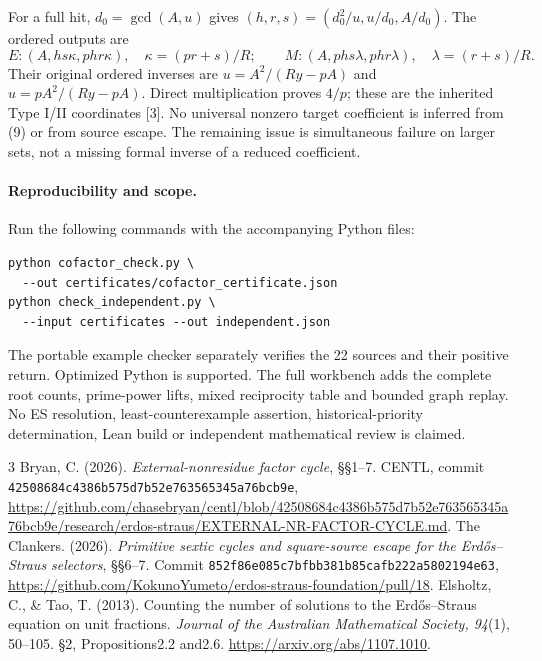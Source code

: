 \documentclass[11pt,reqno]{amsart}
\begin{document}
For a full hit, $d_0=\gcd(A,u)$ gives $(h,r,s)=(d_0^2/u,u/d_0,A/d_0)$.
The ordered outputs are
\[
 E:(A,hs\kappa,phr\kappa),\quad\kappa=(pr+s)/R;
 \qquad M:(A,phs\lambda,phr\lambda),\quad\lambda=(r+s)/R.
\]
Their original ordered inverses are $u=A^2/(Ry-pA)$ and $u=pA^2/(Ry-pA)$.
Direct multiplication proves $4/p$; these are the inherited Type I/II coordinates [3].
No universal nonzero target coefficient is inferred from (9) or from source escape.
The remaining issue is simultaneous failure on larger sets, not a missing
formal inverse of a reduced coefficient.

\paragraph{Reproducibility and scope.}
Run the following commands with the accompanying Python files:
{\small\begin{verbatim}
python cofactor_check.py \
  --out certificates/cofactor_certificate.json
python check_independent.py \
  --input certificates --out independent.json
\end{verbatim}}
The portable example checker separately verifies the 22 sources and their positive
return. Optimized Python is supported. The full workbench adds the complete root
counts, prime-power lifts, mixed reciprocity table and bounded graph replay.
No ES resolution, least-counterexample assertion, historical-priority determination,
Lean build or independent mathematical review is claimed.

\begin{thebibliography}{3}
 Bryan, C. (2026). \emph{External-nonresidue factor cycle}, \S\S1--7.
CENTL, commit \texttt{42508684c4386b575d7b52e763565345a76bcb9e},
\url{https://github.com/chasebryan/centl/blob/42508684c4386b575d7b52e763565345a76bcb9e/research/erdos-straus/EXTERNAL-NR-FACTOR-CYCLE.md}.
\bibitem{Turn3} The Clankers. (2026). \emph{Primitive sextic cycles and square-source
escape for the Erd\H{o}s--Straus selectors}, \S\S6--7. Commit
\texttt{852f86e085c7bfbb381b85cafb222a5802194e63},
\url{https://github.com/KokunoYumeto/erdos-straus-foundation/pull/18}.
\bibitem{ET} Elsholtz, C., \& Tao, T. (2013). Counting the number of solutions to the
Erd\H{o}s--Straus equation on unit fractions. \emph{Journal of the Australian
Mathematical Society, 94}(1), 50--105. \S2, Propositions2.2 and2.6.
\url{https://arxiv.org/abs/1107.1010}.
\end{thebibliography}
\end{document}
